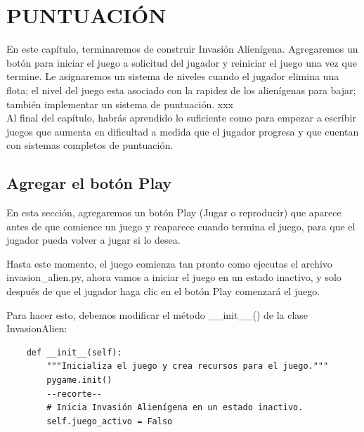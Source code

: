 





\chapter{PUNTUACIÓN}

En este capítulo, terminaremos de construir Invasión Alienígena. Agregaremos un botón para iniciar el juego a solicitud del jugador y reiniciar el juego una vez que termine. Le asignaremos un sistema de niveles cuando el jugador elimina una flota; el nivel del juego esta asociado con la rapidez de los alienígenas para bajar;  también implementar un sistema de puntuación. xxx\\


Al final del capítulo, habrás aprendido  lo suficiente como para empezar a escribir juegos que
aumenta en dificultad a medida que el jugador progresa y que cuentan con sistemas completos de puntuación.


\section{Agregar el botón Play}


En esta sección, agregaremos un botón {\ttfamily Play} (Jugar o reproducir) que aparece antes de que comience un juego y reaparece
cuando termina el juego, para que el jugador pueda volver a jugar si lo desea.

Hasta este momento, el juego comienza tan pronto como ejecutas el archivo {\ttfamily invasion\_alien.py},  ahora  vamos a iniciar el juego en un estado inactivo, y solo después de que el jugador haga clic en el botón  {\ttfamily Play}  comenzará el juego. 


Para hacer esto, debemos modificar el método {\ttfamily \_\_init\_\_()} de la clase  {\ttfamily InvasionAlien}:

\hspace{-2.4cm}{\ttfamily \scriptsize invasión}

\vspace{-0.2cm}
\hspace{-2.1cm}{\ttfamily \scriptsize \_alien.py}\vspace{-0.84cm}
\begin{lstlisting}		
    def __init__(self):
        """Inicializa el juego y crea recursos para el juego."""
        pygame.init()
        --recorte--
        # Inicia Invasión Alienígena en un estado inactivo.
        self.juego_activo = Falso
\end{lstlisting}

